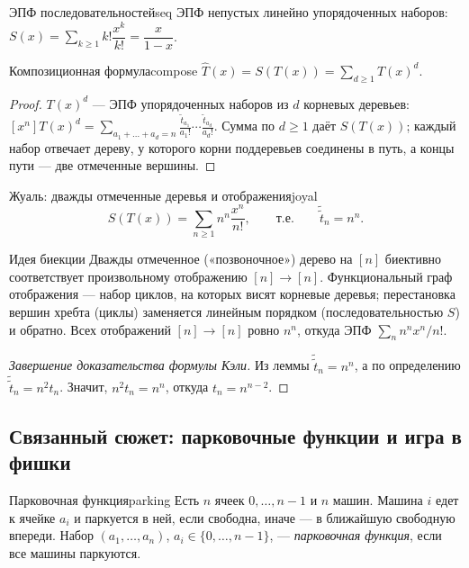 \begin{Definition}{ЭПФ последовательностей}{seq}
	ЭПФ непустых линейно упорядоченных наборов: $S(x)=\sum_{k\ge 1}k!\dfrac{x^k}{k!}=\dfrac{x}{1-x}$.
\end{Definition}

\begin{Statement}{Композиционная формула}{compose}
	$\widehat T(x)=S(T(x))=\sum_{d\ge 1}T(x)^d$.
\end{Statement}

\begin{proof}
	$T(x)^d$ — ЭПФ упорядоченных наборов из $d$ корневых деревьев: $[x^n]T(x)^d=\sum_{a_1+\dots+a_d=n}\frac{\widetilde t_{a_1}}{a_1!}\cdots\frac{\widetilde t_{a_d}}{a_d!}$. Сумма по $d\ge 1$ даёт $S(T(x))$; каждый набор отвечает дереву, у которого корни поддеревьев соединены в путь, а концы пути — две отмеченные вершины.
\end{proof}

\begin{Lemma}{Жуаль: дважды отмеченные деревья и отображения}{joyal}
	\[
	S(T(x))=\sum_{n\ge 1}n^n\frac{x^n}{n!},\qquad\text{т.е.}\qquad \widetilde{\widetilde t}_n=n^n.
	\]
\end{Lemma}

\begin{Remark}{Идея биекции}{}
	Дважды отмеченное («позвоночное») дерево на $[n]$ биективно соответствует произвольному отображению $[n]\to[n]$. Функциональный граф отображения — набор циклов, на которых висят корневые деревья; перестановка вершин хребта (циклы) заменяется линейным порядком (последовательностью $S$) и обратно. Всех отображений $[n]\to[n]$ ровно $n^n$, откуда ЭПФ $\sum_n n^n x^n/n!$.
\end{Remark}

\begin{proof}[Завершение доказательства формулы Кэли]
	Из леммы $\widetilde{\widetilde t}_n=n^n$, а по определению $\widetilde{\widetilde t}_n=n^2 t_n$. Значит, $n^2 t_n=n^n$, откуда $t_n=n^{n-2}$.
\end{proof}

\subsection{Связанный сюжет: парковочные функции и игра в фишки}

\begin{Definition}{Парковочная функция}{parking}
	Есть $n$ ячеек $0,\dots,n-1$ и $n$ машин. Машина $i$ едет к ячейке $a_i$ и паркуется в ней, если свободна, иначе — в ближайшую свободную впереди. Набор $(a_1,\dots,a_n)$, $a_i\in\{0,\dots,n-1\}$, — \emph{парковочная функция}, если все машины паркуются.
\end{Definition}

